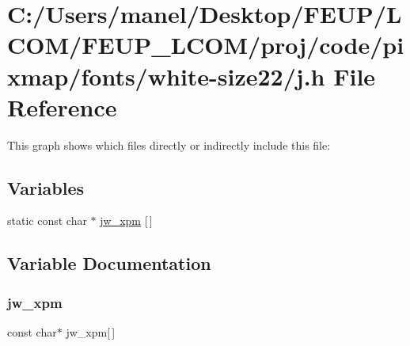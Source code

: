 \hypertarget{white-size22_2j_8h}{}\section{C\+:/\+Users/manel/\+Desktop/\+F\+E\+U\+P/\+L\+C\+O\+M/\+F\+E\+U\+P\+\_\+\+L\+C\+O\+M/proj/code/pixmap/fonts/white-\/size22/j.h File Reference}
\label{white-size22_2j_8h}
This graph shows which files directly or indirectly include this file\+:
\subsection*{Variables}
\begin{DoxyCompactItemize}
\item 
static const char $\ast$ \mbox{\hyperlink{white-size22_2j_8h_a2df611f1749d3cc59e780f5e8e4066bb}{jw\+\_\+xpm}} \mbox{[}$\,$\mbox{]}
\end{DoxyCompactItemize}


\subsection{Variable Documentation}
\mbox{\label{white-size22_2j_8h_a2df611f1749d3cc59e780f5e8e4066bb}} 
\subsubsection{\texorpdfstring{jw\_xpm}{jw\_xpm}}
{\footnotesize\ttfamily const char$\ast$ jw\+\_\+xpm\mbox{[}$\,$\mbox{]}\hspace{0.3cm}{\ttfamily [static]}}


